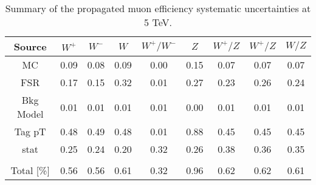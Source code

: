 \begin{table}[htbp]
\begin{center}
\begin{tabular}{ccccccccc}
\hline
Source & $W^+$& $W^-$ & $W$ & $W^+/W^-$ & $Z$ & $W^+/Z$&$W^+/Z$ &$W/Z$  \\
\hline \hline
MC & 0.09 & 0.08 & 0.09 & 0.00 & 0.15 & 0.07 & 0.07 & 0.07 \\
FSR & 0.17 & 0.15 & 0.32 & 0.01 & 0.27 & 0.23 & 0.26 & 0.24 \\
Bkg Model & 0.01 & 0.01 & 0.01 & 0.01 & 0.00 & 0.01 & 0.01 & 0.01 \\
Tag pT & 0.48 & 0.49 & 0.48 & 0.01 & 0.88 & 0.45 & 0.45 & 0.45 \\
stat & 0.25 & 0.24 & 0.20 & 0.32 & 0.26 & 0.38 & 0.36 & 0.35 \\
 \\
\hline \hline
Total [\%] & 0.56 & 0.56 & 0.61 & 0.32 & 0.96 & 0.62 & 0.62 & 0.61 \\
\end{tabular}
\end{center}
\caption{Summary of the propagated muon efficiency systematic uncertainties at 5 TeV.}
\label{tab:Eff:Unc:mu:summary:5}
\end{table}
